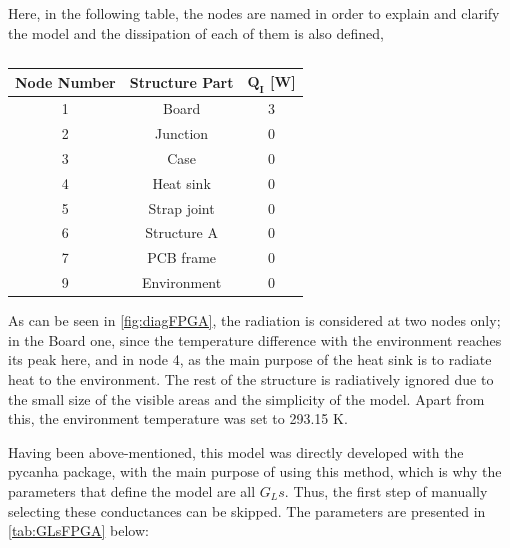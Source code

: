 Here, in the following table, the nodes are named in order to explain and clarify the model and the dissipation of each of them is also defined,

\begin{table}[H]
    \centering
    \caption{}
    \label{tab:nodesFPGA}
    \begin{tabular}{c c c}
    \toprule
    \multicolumn{1}{c}{\textbf{Node Number}} & \multicolumn{1}{c}{\textbf{Structure Part}} & \multicolumn{1}{c}{$\boldsymbol{Q_I}$ [W]} \\\midrule
    1 & Board  & 3 \\
    2 & Junction  & 0 \\
    3 & Case  & 0 \\
    4 & Heat sink  & 0 \\
    5 & Strap joint  & 0 \\
    6 & Structure A  & 0 \\
    7 & PCB frame  & 0 \\
    9 & Environment  & 0 \\\bottomrule
    \end{tabular}
    \end{table}

As can be seen in \autoref{fig:diagFPGA}, the radiation is considered at two nodes only; in the Board one, since the temperature difference with the environment reaches its peak here, and in node 4, as the main purpose of the heat sink is to radiate heat to the environment. The rest of the structure is radiatively ignored due to the small size of the visible areas and the simplicity of the model. Apart from this, the environment temperature was set to 293.15 K.

Having been above-mentioned, this model was directly developed with the pycanha package, with the main purpose of using this method, which is why the parameters that define the model are all $G_Ls$. Thus, the first step of manually selecting these conductances can be skipped. The parameters are presented in \autoref{tab:GLsFPGA} below:

